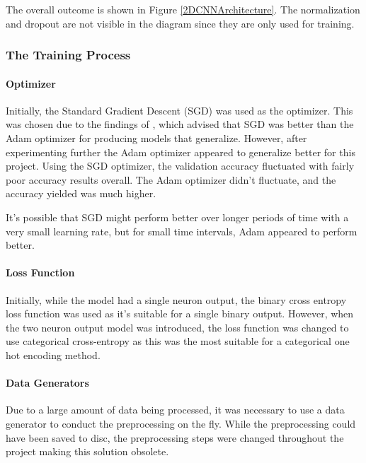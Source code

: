\documentclass[12pt,a4paper]{article}
\begin{document}
                The overall outcome is shown in Figure \ref{2DCNNArchitecture}. The normalization and dropout are not visible in the diagram since they are only used for training.

        
            \subsubsection{The Training Process}
                \paragraph{Optimizer}
                Initially, the Standard Gradient Descent (SGD) was used as the optimizer. This was chosen due to the findings of \cite{SGDBetterThanAdamForImageClassification},
                which advised that SGD was better than the Adam optimizer for producing models that generalize. However, after experimenting further the Adam optimizer appeared to generalize better for this project. Using the SGD optimizer, the validation accuracy fluctuated with fairly poor accuracy results overall. The Adam optimizer didn't fluctuate, and the accuracy yielded was much higher.

                It's possible that SGD might perform better over longer periods of time with a very small learning rate, but for small time intervals, Adam appeared to perform better.


                \paragraph{Loss Function}
                Initially, while the model had a single neuron output, the binary cross entropy loss function was used as it's suitable for a single binary output.
                However, when the two neuron output model was introduced, the loss function was changed to use categorical cross-entropy as this was the most suitable
                for a categorical one hot encoding method.

                \paragraph{Data Generators}
                Due to a large amount of data being processed, it was necessary to use a data generator to conduct the preprocessing on the fly. While the preprocessing could have been saved to disc, the preprocessing steps were changed throughout the project making this solution obsolete.
\end{document}
